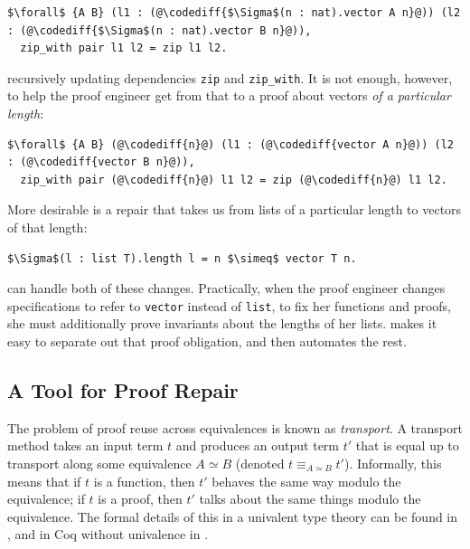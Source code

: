 \begin{lstlisting}
$\forall$ {A B} (l1 : (@\codediff{$\Sigma$(n : nat).vector A n}@)) (l2 : (@\codediff{$\Sigma$(n : nat).vector B n}@)),
  zip_with pair l1 l2 = zip l1 l2.
\end{lstlisting}
recursively updating dependencies \lstinline{zip} and \lstinline{zip_with}.
It is not enough, however, to help the proof engineer get from that to a proof about vectors \textit{of a particular length}:

\begin{lstlisting}
$\forall$ {A B} (@\codediff{n}@) (l1 : (@\codediff{vector A n}@)) (l2 : (@\codediff{vector B n}@)),
  zip_with pair (@\codediff{n}@) l1 l2 = zip (@\codediff{n}@) l1 l2.
\end{lstlisting}

More desirable is a repair that takes us from lists of a particular length to vectors of that length:

\begin{lstlisting}
$\Sigma$(l : list T).length l = n $\simeq$ vector T n.
\end{lstlisting}
\toolname can handle both of these changes.
Practically, when the proof engineer changes specifications to refer to \lstinline{vector} instead of \lstinline{list},
to fix her functions and proofs, she must additionally prove invariants about the lengths of her lists.
\toolname makes it easy to separate out that proof obligation, and then automates the rest.

\subsection{A Tool for Proof Repair}
\label{sec:time}

The problem of proof reuse across equivalences is known as \textit{transport}.
A transport method takes an input term $t$ and produces an output term $t'$ that is equal up to transport
along some equivalence $A \simeq B$ (denoted $t \equiv_{A \simeq B} t'$). Informally, this means that if $t$ is a function, then $t'$ behaves the same way modulo the equivalence;
if $t$ is a proof, then $t'$ talks about the same things modulo the equivalence.
The formal details of this in a univalent type theory can be found in \citet{univalent2013homotopy}, and in Coq
without univalence in \citet{tabareau2017equivalences}.

